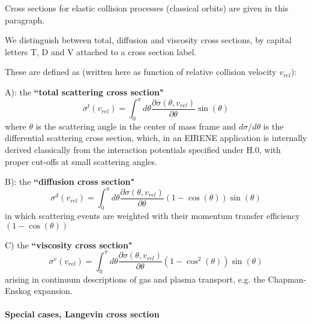 \documentclass[12pt,dvipdfmx]{article}
\begin{document}
Cross sections for elastic collision processes (classical orbits) are given in this paragraph.

We distinguish between total, diffusion and viscosity cross sections, by capital letters T, D and V
attached to a cross section label.

These are defined as (written here as function of relative collision velocity $v_{rel}$):

A): the \textbf{``total scattering cross section"}
\begin{equation}
\sigma^t(v_{rel}) = \int_0^{\pi} d\theta \frac{\partial\sigma(\theta,v_{rel})}{\partial\theta} \sin(\theta)
\end{equation}
where $\theta$ is the scattering angle in the center of mass frame and $d\sigma/d\theta$ is the differential scattering cross section,
which, in an EIRENE application is internally derived classically from the interaction potentials specified under H.0, with proper cut-offs
at small scattering angles.

B): the \textbf{``diffusion cross section"}
\begin{equation}
\sigma^d(v_{rel}) = \int_0^{\pi} d\theta \frac{\partial\sigma(\theta,v_{rel})}{\partial\theta} (1-\cos(\theta)) \sin(\theta)
\end{equation}
in which scattering events are weighted with their momentum transfer efficiency  $(1-\cos(\theta))$

C) the \textbf{``viscosity cross section"}
\begin{equation}
\sigma^v(v_{rel}) = \int_0^{\pi} d\theta \frac{\partial\sigma(\theta,v_{rel})}{\partial\theta} (1-\cos^2(\theta)) \sin(\theta)
\end{equation}
arising in continuum descriptions of gas and plasma transport, e.g. the Chapman-Enskog expansion.

\paragraph*{\textbf{Special cases, Langevin cross section}}
\end{document}
